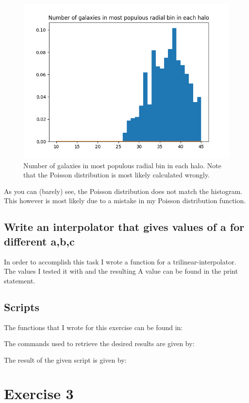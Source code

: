 \documentclass[a4paper,10pt]{article}
\begin{document}
\begin{figure}[h!]
  \centering
  \includegraphics[width=0.9\linewidth]{./plots/2_g.png}
  \caption{Number of galaxies in most populous radial bin in each halo. Note that the Poisson distribution is most likely calculated wrongly.}
  \label{fig:fig2.3}
\end{figure}

As you can (barely) see, the Poisson distribution does not match the histogram. This however is most likely due to a mistake in my Poisson distribution function.

\subsection{Write an interpolator that gives values of a for different a,b,c}

In order to accomplish this task I wrote a function for a trilinear-interpolator. The values I tested it with and the resulting A value can be found in the print statement.

\subsection{Scripts}

The functions that I wrote for this exercise can be found in: 


The commands used to retrieve the desired results are given by:


The result of the given script is given by:


\section{Exercise 3}
\end{document}
